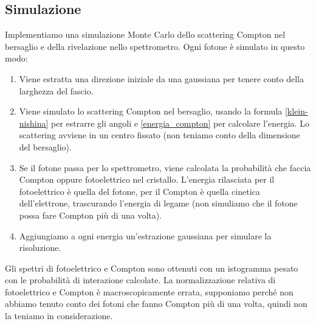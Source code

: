 \subsection{Simulazione}

Implementiamo una simulazione Monte Carlo dello scattering Compton nel bersaglio
e della rivelazione nello spettrometro.
Ogni fotone è simulato in questo modo:
\begin{enumerate}
	\item Viene estratta una direzione iniziale da una gaussiana per tenere conto della larghezza del fascio.
	\item Viene simulato lo scattering Compton nel bersaglio,
	usando la formula \eqref{klein-nishina} per estrarre gli angoli e \eqref{energia_compton} per calcolare l'energia.
	Lo scattering avviene in un centro fissato (non teniamo conto della dimensione del bersaglio).
	\item Se il fotone passa per lo spettrometro,
	viene calcolata la probabilità che faccia Compton oppure fotoelettrico nel cristallo.
	L'energia rilasciata per il fotoelettrico è quella del fotone,
	per il Compton è quella cinetica dell'elettrone, trascurando l'energia di legame
	(non simuliamo che il fotone possa fare Compton più di una volta).
	\item Aggiungiamo a ogni energia un'estrazione gaussiana
	per simulare la risoluzione.
\end{enumerate}
Gli spettri di fotoelettrico e Compton sono ottenuti con un istogramma pesato con le probabilità di interazione calcolate.
La normalizzazione relativa di fotoelettrico e Compton è macroscopicamente errata,
supponiamo perché non abbiamo tenuto conto dei fotoni che fanno Compton più di una volta,
quindi non la teniamo in considerazione.
